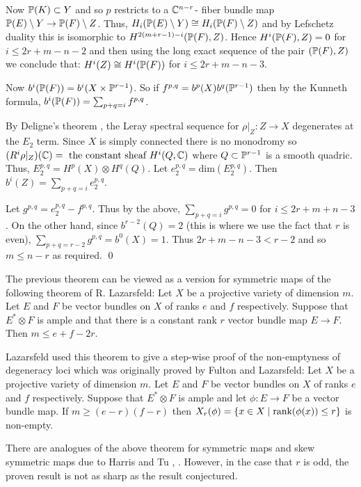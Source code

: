 Now $\Bbb P(K) \subset Y$ and so  $p$ restricts to a
$\Bbb C^{n-r}$- fiber bundle map $\Bbb P(E) \setminus Y \to \Bbb P(F) \setminus Z$.
Thus, $H_i(\Bbb P(E) \setminus Y) \cong H_i(\Bbb P(F) \setminus Z)$ and by
Lefschetz duality this is isomorphic to $H^{2(m+r-1) -i}(\Bbb P(F), Z)$.
Hence $H^i(\Bbb P(F), Z) = 0$ for $i \le 2r + m - n -2$ and then using the
long exact sequence of the pair $(\Bbb P(F), Z)$ we conclude that:
$H^i(Z) \cong H^i(\Bbb P(F))$ for $i \le 2r + m - n -3$.

Now $b^i(\Bbb P(F)) = b^i(X \times \Bbb P^{r-1})$.
So if $f^{p,q} = b^p(X) b^q(\Bbb P^{r-1})$ then by the Kunneth formula,
$b^i(\Bbb P(F)) = \sum_{p+q = i} f^{p,q}$.

By Deligne's theorem \cite{GH, pg 466}, the Leray spectral sequence for 
$\rho \vert_Z : Z \to X$
degenerates at the $E_2$ term. Since $X$ is simply connected there is no
monodromy so 
$(R^i \rho \vert_Z) (\Bbb C) = \text{ the constant sheaf } H^i(Q,\Bbb C)$
 where
$Q \subset \Bbb P^{r-1}$ is a smooth quadric. Thus,
$E_2^{p,q} = H^p(X) \otimes H^q(Q)$.
 Let $e_2^{p,q} = \text{dim} (E_2^{p,q})$.
Then $b^i(Z) = \sum_{p+q=i} e_2^{p,q}$.

Let $g^{p,q} = e_2^{p,q} - f^{p,q}$. Thus by the above,
 $\sum_{p+q=i} g^{p,q} = 0$ for $i \le 2r+m+n-3$.
 On the other hand, since $b^{r-2}(Q) = 2$ (this is where we use the fact 
that $r$ is even), $\sum_{p+q = r-2} g^{p,q} = b^0(X) = 1$.
Thus $2r+m-n-3 < r-2$ and so $m \le n-r$ as required.
\qed
\enddemo

The previous theorem can be viewed as a version for symmetric maps
of the following theorem of R. Lazarsfeld:
 \cite{Laz, Theorem 2.2, pg. 41}
 Let $X$ be a projective variety of dimension $m$. Let
$E$ and $F$ be vector bundles on $X$ of ranks $e$ and $f$ respectively.
Suppose that $E^* \otimes F$ is ample and that there is a constant rank
$r$ vector bundle map $E \to F$. Then $m \le e + f - 2r$.
\endproclaim

Lazarsfeld used this theorem to give a step-wise proof of the
non-emptyness of degeneracy loci which was originally proved 
by Fulton and Lazarsfeld:
 \cite{Laz, Theorem 2.1, pg. 40}
 Let $X$ be a projective variety of dimension $m$. Let
$E$ and $F$ be vector bundles on $X$ of ranks $e$ and $f$ respectively.
Suppose that $E^* \otimes F$ is ample and let $\phi:E \to F$ be
a vector bundle map. If $m \ge (e-r)(f-r)$ then
$X_r(\phi) = \{ x \in X \mid \text{rank}(\phi(x)) \le r \}$ is non-empty.
\endproclaim

There are analogues of the above theorem for symmetric maps and
skew symmetric maps due to Harris and Tu \cite{T}, \cite{HT}.
However, in the case that
$r$ is odd, the proven result is not as sharp as the result conjectured.

